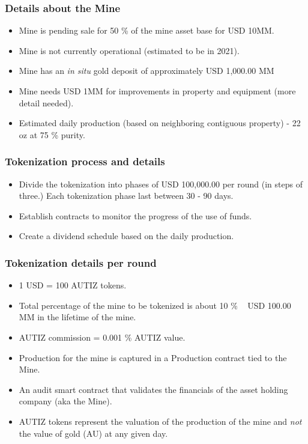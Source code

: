 \documentclass{beamer}
\begin{document}
\begin{frame}
\frametitle{Details about the Mine}
\begin{minipage}{\textwidth}
  \begin{itemize}
    \item  Mine is pending sale for 50 \% of the mine asset base for USD 10MM.
    \item  Mine is not currently operational (estimated to be in 2021).
    \item  Mine has an \textit{in situ} gold deposit of approximately USD 1,000.00 MM
    \item  Mine needs USD 1MM for improvements in property and equipment (more detail needed).
    \item  Estimated daily production (based on neighboring contiguous property) - 22 oz at 75 \% purity.
  \end{itemize}
\end{minipage}
\end{frame}

\begin{frame}
\frametitle{Tokenization process and details}
\begin{minipage}{\textwidth}
  \begin{itemize}
    \item  Divide the tokenization into phases of USD 100,000.00 per round (in steps of three.) Each tokenization phase last between 30 - 90 days.
    \item  Establish contracts to monitor the progress of the use of funds.
    \item  Create a dividend schedule based on the daily production.
  \end{itemize}
  \end{minipage}
\end{frame}

\begin{frame}
\frametitle {Tokenization details per round}
\begin{minipage}{\textwidth}
  \begin{itemize}
    \item  1 USD = 100 AUTIZ tokens.
    \item  Total percentage of the mine to be tokenized is about 10 \% ~ USD 100.00 MM in the lifetime of the mine.
    \item  AUTIZ commission = 0.001 \% AUTIZ value.
    \item  Production for the mine is captured in a Production contract tied to the Mine.
    \item  An audit smart contract that validates the financials of the asset holding company (aka the Mine).
    \item  AUTIZ tokens represent the valuation of the production of the mine and \textit{not} the value of gold (AU) at any given day.
  \end{itemize}
  \end{minipage}
\end{frame}
\end{document}
